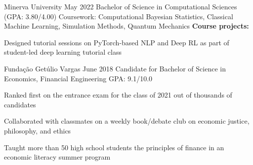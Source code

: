 \begin{education_xp}
                   {Minerva University}
                   {May 2022}
                   {Bachelor of Science in Computational Sciences (GPA: 3.80/4.00)}
    Coursework: Computational Bayesian Statistics, Classical Machine Learning, Simulation Methods, Quantum Mechanics\newline
    \textbf{Course projects:}
    \begin{highlights}
        \item Designed tutorial sessions on PyTorch-based NLP and Deep RL as part of student-led deep learning tutorial class
    \end{highlights}
\end{education_xp}

\begin{exclude}
    \begin{education_xp}
                   {Fundação Getúlio Vargas}
                   {June 2018}
                   {Candidate for Bachelor of Science in Economics, Financial Engineering}
                   {GPA: 9.1/10.0}
    \begin{highlights}
        \item Ranked first on the entrance exam for the class of 2021 out of thousands of candidates
        \item Collaborated with classmates on a weekly book/debate club on economic justice, philosophy, and ethics
        \item Taught more than 50 high school students the principles of finance in an economic literacy summer program
    \end{highlights}
    \end{education_xp}
\end{exclude}